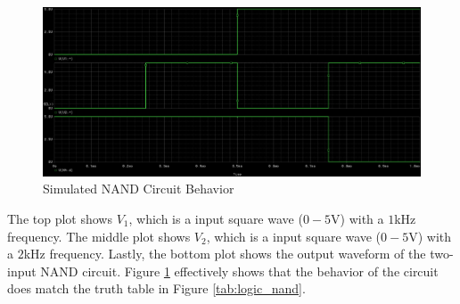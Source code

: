 \begin{figure}[h!]
	\centering
	\includegraphics[scale=0.35]{../images/nand_transient_output.PNG}
	\caption{Simulated NAND Circuit Behavior}
	\label{fig:nand_sim}
\end{figure}

\FloatBarrier

The top plot shows $V_1$, which is a input square wave ($0 - 5$\si{\volt}) with a $1$\si{\kilo\hertz} frequency.
The middle plot shows $V_2$, which is a input square wave ($0 - 5$\si{\volt}) with a $2$\si{\kilo\hertz} frequency.
Lastly, the bottom plot shows the output waveform of the two-input NAND circuit.
Figure \ref{fig:nand_sim} effectively shows that the behavior of the circuit does match the truth table in Figure \ref{tab:logic_nand}.

